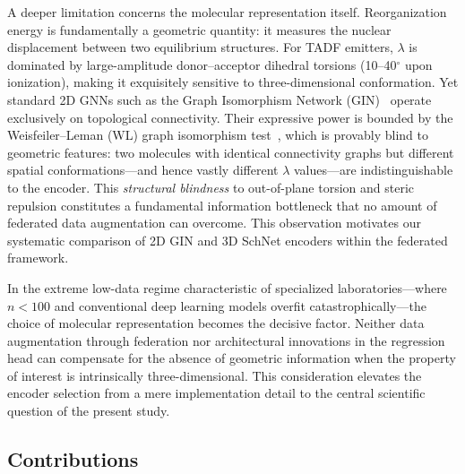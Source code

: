 \documentclass[twocolumn]{article}
\newcommand{\lam}{\lambda}
\begin{document}
A deeper limitation concerns the molecular representation itself.
Reorganization energy is fundamentally a geometric quantity: it measures the nuclear displacement between two equilibrium structures.
For TADF emitters, $\lam$ is dominated by large-amplitude donor--acceptor dihedral torsions (10--40$^{\circ}$ upon ionization), making it exquisitely sensitive to three-dimensional conformation.
Yet standard 2D GNNs such as the Graph Isomorphism Network (GIN)~\cite{Xu2019_GIN} operate exclusively on topological connectivity.
Their expressive power is bounded by the Weisfeiler--Leman (WL) graph isomorphism test~\cite{Xu2019_GIN}, which is provably blind to geometric features: two molecules with identical connectivity graphs but different spatial conformations---and hence vastly different $\lam$ values---are indistinguishable to the encoder.
This \emph{structural blindness} to out-of-plane torsion and steric repulsion constitutes a fundamental information bottleneck that no amount of federated data augmentation can overcome.
This observation motivates our systematic comparison of 2D GIN and 3D SchNet encoders within the federated framework.

In the extreme low-data regime characteristic of specialized laboratories---where $n < 100$ and conventional deep learning models overfit catastrophically---the choice of molecular representation becomes the decisive factor.
Neither data augmentation through federation nor architectural innovations in the regression head can compensate for the absence of geometric information when the property of interest is intrinsically three-dimensional.
This consideration elevates the encoder selection from a mere implementation detail to the central scientific question of the present study.

\subsection*{Contributions}
\end{document}
